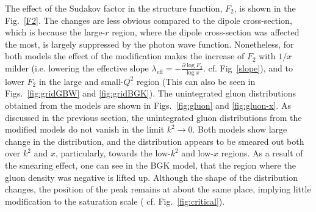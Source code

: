 \documentclass[11pt]{article}
\begin{document}
The effect of the Sudakov factor in the structure function, $F_2$, is shown in the Fig.~\ref{F2}. The changes are less obvious compared to the dipole cross-section, which is because the large-$r$ region, where the dipole cross-section was affected the most, is largely suppressed by the photon wave function.  Nonetheless, for both models the effect of the modification makes the increase of $F_2$ with $1/x$ milder (i.e. lowering the effective slope $\lambda_{\mathrm{eff}}=-\frac{\partial \log F_2}{\log x}$. cf. Fig~\ref{slope}), %
and to lower $F_2$ in the large and small-$Q^2$ region (This can also be seen in Figs.~\ref{fig:gridGBW} and \ref{fig:gridBGK}). 
The unintegrated gluon distributions obtained from the models are shown in Figs.~\ref{fig:gluon} and \ref{fig:gluon-x}. As discussed in the previous section, the unintegrated gluon distributions from the modified models do not vanish in the limit $k^2\rightarrow0$. Both models show large change in the distribution, and the distribution appears to be smeared out both over $k^2$ and $x$, particularly, towards the low-$k^2$ and low-$x$ regions. As a result of the smearing effect, one can see in the BGK model, that the region where the gluon density was negative is lifted up.   
Although the shape of the distribution changes, the position of the peak remains at about the same place, implying little modification to the saturation scale ( cf. Fig.~\ref{fig:critical}). 
\end{document}
